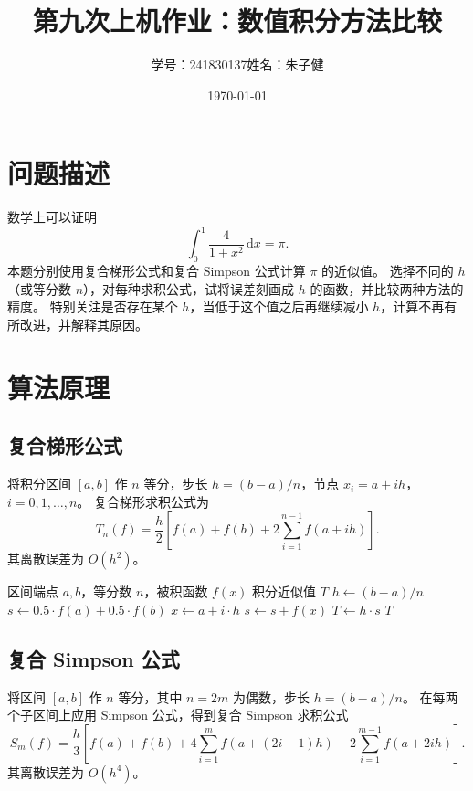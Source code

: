 \documentclass{article}
\title{第九次上机作业：数值积分方法比较}
\author{学号：241830137\quad 姓名：朱子健}
\date{\today}
\begin{document}
\maketitle

\section{问题描述}

数学上可以证明
\begin{equation}
    \int_{0}^{1} \frac{4}{1 + x^{2}} \, \mathrm{d}x = \pi .
\end{equation}
本题分别使用复合梯形公式和复合 Simpson 公式计算 $\pi$ 的近似值。 选择不同的 $h$（或等分数 $n$），对每种求积公式，试将误差刻画成 $h$ 的函数，并比较两种方法的精度。 特别关注是否存在某个 $h$，当低于这个值之后再继续减小 $h$，计算不再有所改进，并解释其原因。

\section{算法原理}

\subsection{复合梯形公式}
将积分区间 $[a,b]$ 作 $n$ 等分，步长 $h = (b-a)/n$，节点 $x_i = a + i h$，$i=0,1,\dots,n$。 复合梯形求积公式为
\begin{equation}
    T_n(f) = \frac{h}{2}\left[ f(a) + f(b) + 2\sum_{i=1}^{n-1} f(a + i h) \right].
\end{equation}
其离散误差为 $O(h^2)$。

\begin{algorithm}[H]
\caption{复合梯形公式}
\begin{algorithmic}[1]
\REQUIRE 区间端点 $a, b$，等分数 $n$，被积函数 $f(x)$
\ENSURE 积分近似值 $T$
\STATE $h \gets (b - a) / n$
\STATE $s \gets 0.5 \cdot f(a) + 0.5 \cdot f(b)$
    \STATE $x \gets a + i \cdot h$
    \STATE $s \gets s + f(x)$
\ENDFOR
\STATE $T \gets h \cdot s$
\RETURN $T$
\end{algorithmic}
\end{algorithm}

\subsection{复合 Simpson 公式}
将区间 $[a,b]$ 作 $n$ 等分，其中 $n=2m$ 为偶数，步长 $h = (b-a)/n$。 在每两个子区间上应用 Simpson 公式，得到复合 Simpson 求积公式
\begin{equation}
    S_m(f) = \frac{h}{3}\left[ f(a) + f(b) + 4\sum_{i=1}^{m} f(a + (2i-1)h) + 2\sum_{i=1}^{m-1} f(a + 2i h) \right].
\end{equation}
其离散误差为 $O(h^4)$。
\end{document}
